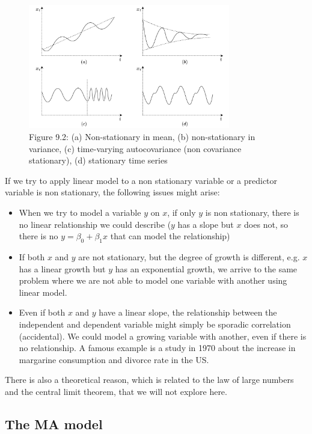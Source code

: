 \begin{figure}[htbp]
    \begin{center}
        \includegraphics[width=250pt]{../img/09-stationary.png}
        \caption{Figure 9.2:  (a) Non-stationary in mean, (b) non-stationary in variance, (c) time-varying autocovariance (non covariance stationary), (d) stationary time series}
    \end{center}
\end{figure}


If we try to apply linear model to a non stationary variable or a predictor variable is non stationary, the following issues might arise:
\begin{itemize}
    \item When we try to model a variable \(y\) on \(x\), if only \(y\) is non stationary, there is no linear relationship we could describe (\(y\) has a slope but \(x\) does not, so there is no \(y = \beta_0 + \beta_1 x\) that can model the relationship)
    \item If both \(x\) and \(y\) are not stationary, but the degree of growth is different, e.g. \(x\) has a linear growth but \(y\) has an exponential growth, we arrive to the same problem where we are not able to model one variable with another using linear model.
    \item Even if both \(x\) and \(y\) have a linear slope, the relationship between the independent and dependent variable might simply be sporadic correlation (accidental). We could model a growing variable with another, even if there is no relationship. A famous example is a study in 1970 about the increase in margarine consumption and divorce rate in the US.
\end{itemize}

There is also a theoretical reason, which is related to the law of large numbers and the central limit theorem, that we will not explore here.

\subsection{The MA model}

